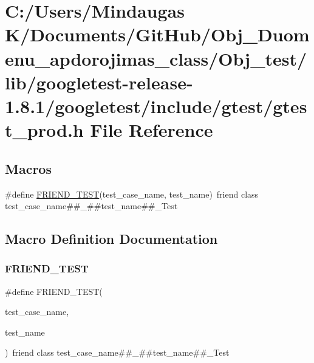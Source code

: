 \hypertarget{_obj__test_2lib_2googletest-release-1_88_81_2googletest_2include_2gtest_2gtest__prod_8h}{}\section{C\+:/\+Users/\+Mindaugas K/\+Documents/\+Git\+Hub/\+Obj\+\_\+\+Duomenu\+\_\+apdorojimas\+\_\+class/\+Obj\+\_\+test/lib/googletest-\/release-\/1.8.1/googletest/include/gtest/gtest\+\_\+prod.h File Reference}
\label{_obj__test_2lib_2googletest-release-1_88_81_2googletest_2include_2gtest_2gtest__prod_8h}
\subsection*{Macros}
\begin{DoxyCompactItemize}
\item 
\#define \mbox{\hyperlink{_obj__test_2lib_2googletest-release-1_88_81_2googletest_2include_2gtest_2gtest__prod_8h_a8d443b4cc1d87a7a17943b8fbdbf3910}{F\+R\+I\+E\+N\+D\+\_\+\+T\+E\+ST}}(test\+\_\+case\+\_\+name,  test\+\_\+name)~friend class test\+\_\+case\+\_\+name\#\#\+\_\+\#\#test\+\_\+name\#\#\+\_\+\+Test
\end{DoxyCompactItemize}


\subsection{Macro Definition Documentation}
\mbox{\label{_obj__test_2lib_2googletest-release-1_88_81_2googletest_2include_2gtest_2gtest__prod_8h_a8d443b4cc1d87a7a17943b8fbdbf3910}} 
\subsubsection{\texorpdfstring{FRIEND\_TEST}{FRIEND\_TEST}}
{\footnotesize\ttfamily \#define F\+R\+I\+E\+N\+D\+\_\+\+T\+E\+ST(\begin{DoxyParamCaption}\item[{}]{test\+\_\+case\+\_\+name,  }\item[{}]{test\+\_\+name }\end{DoxyParamCaption})~friend class test\+\_\+case\+\_\+name\#\#\+\_\+\#\#test\+\_\+name\#\#\+\_\+\+Test}

